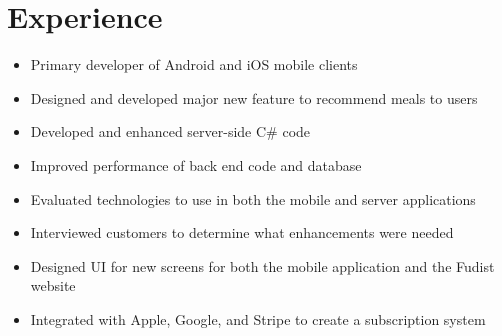 \documentclass[12pt,letterpaper,sans]{moderncv}
\begin{document}
\section{Experience}
    \begin{itemize}[leftmargin=1.24in]
    	\item Primary developer of Android and iOS mobile clients
		\item Designed and developed major new feature to recommend meals to users
		\item Developed and enhanced server-side C\# code
    	\item Improved performance of back end code and database
    	\item Evaluated technologies to use in both the mobile and server applications
    	\item Interviewed customers to determine what enhancements were needed
    	\item Designed UI for new screens for both the mobile application and the Fudist website
    	\item Integrated with Apple, Google, and Stripe to create a subscription system	
    \end{itemize}
\end{document}
